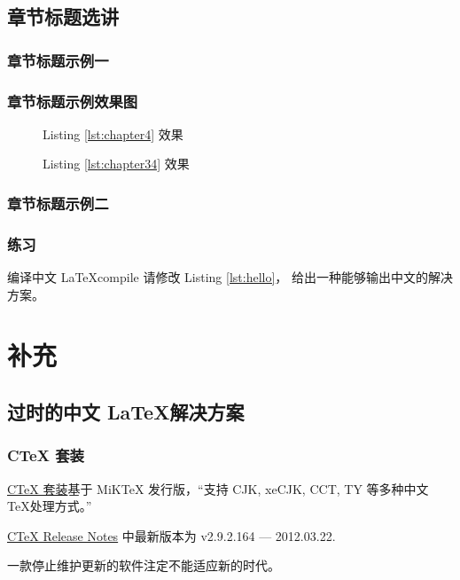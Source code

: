 \documentclass[final,aspectratio=169]{ctexbeamer}
\begin{document}
\subsection{章节标题选讲}\label{sec:section-title}

\begin{frame}
\frametitle{章节标题示例一}
\end{frame}

\begin{frame}
\frametitle{章节标题示例效果图}
\begin{figure}
\centering
\caption{Listing \ref{lst:chapter4} 效果}
\label{img:4}
\end{figure}
\begin{figure}
\centering
{}
\caption{Listing \ref{lst:chapter34} 效果}
\label{img:34}
\end{figure}
\end{frame}

\begin{frame}
\frametitle{章节标题示例二}
\end{frame}

\begin{frame}
\frametitle{练习}
\begin{Ex}{编译中文 \LaTeX}{compile}
请修改 Listing \ref{lst:hello}， 给出一种能够输出中文的解决方案。
\end{Ex}
\end{frame}

\section{补充}
\subsection[过时的中文方案]{过时的中文 \LaTeX 解决方案}
\begin{frame}
\frametitle{CTeX 套装}
\href{http://www.ctex.org/CTeX}{CTeX 套装}基于 MiKTeX 发行版，“支持 CJK, xeCJK, CCT, TY 等多种中文 \TeX 处理方式。”

\href{http://www.ctex.org/CTeXReleaseNotes}{CTeX Release Notes} 中最新版本为 v2.9.2.164 --- 2012.03.22.

\alert{一款停止维护更新的软件注定不能适应新的时代。}
\end{frame}
\end{document}
